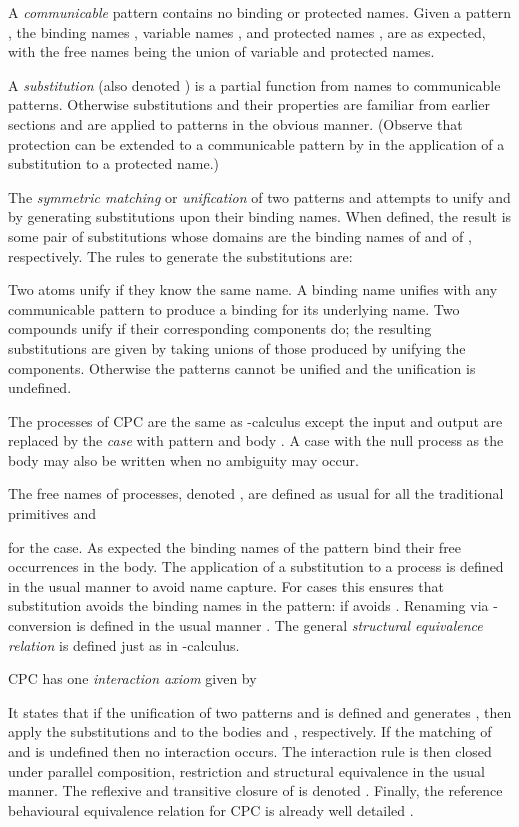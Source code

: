 \documentclass{llncs}
\begin{document}
A {\em communicable} pattern contains no binding or protected names.
Given a pattern , the
binding names ,
variable names ,
and protected names ,
are as expected, with the free names  being the union of variable and protected names.


A {\em substitution}  (also denoted
) is a partial function
from names to communicable patterns.
Otherwise substitutions and their
properties are familiar from earlier sections and are applied to patterns
in the obvious manner.
(Observe that protection can be extended to a communicable pattern by
 in the application of a
substitution to a protected name.)

The {\em symmetric matching} or {\em unification}  of
two patterns  and  attempts to unify  and  by generating
substitutions upon their binding names. When defined, the result is
some pair of substitutions whose domains are the binding names of 
and of , respectively.
The rules to generate the substitutions are:

Two atoms unify if they know the same name. A binding name unifies with any communicable pattern to
produce a binding for its underlying name.  Two compounds unify if
their corresponding components do; the resulting substitutions are
given by taking unions of those produced by unifying the components.
Otherwise the patterns cannot be unified and the unification is undefined.


The processes of CPC are the same as -calculus except the
input and output are replaced by the {\em case}  with pattern  and body .
A case with the null process as the body  may also be written  when no
ambiguity may occur.

The free names of processes, denoted , are defined as
usual for all the traditional primitives and

for the case. As expected the binding names of the pattern bind their free occurrences in the body.
The application  of a substitution  to a process  is defined in the usual
manner to avoid name capture. For cases this ensures that substitution avoids the binding names in the pattern:
 if  avoids .
Renaming via -conversion is defined in the usual manner
\cite{GivenWilsonGorlaJay10,GivenWilsonPHD,givenwilson:hal-00987578}.
The general {\em structural equivalence relation}  is defined
just as in -calculus.



\label{sec:reduction-new}
CPC has one {\em interaction axiom} given by

It states that if the unification of two patterns  and  is
defined and generates , then apply the
substitutions  and  to the bodies  and ,
respectively.  If the matching of  and  is undefined then no
interaction occurs.
The interaction rule is then closed under
parallel composition, restriction and structural equivalence in the usual manner.
The reflexive and transitive closure of  is denoted .
Finally, the reference behavioural equivalence relation  for CPC is already
well detailed \cite{GivenWilsonPHD,GivenWilsonGorla13,givenwilson:hal-00987578}.
\end{document}

